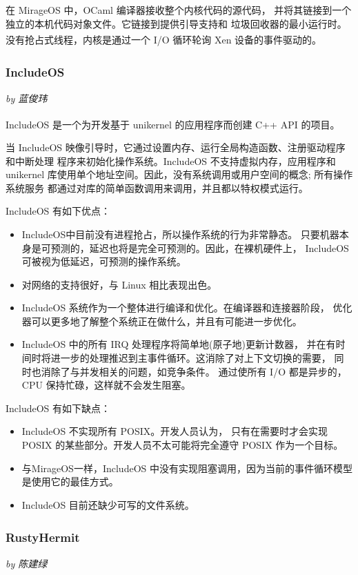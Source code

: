 \documentclass[UTF8,fontset=none,linespread=1.15]{ctexart}
\let\nosupcite\cite
\renewcommand*{\cite}[1]{\textsuperscript{\nosupcite{#1}}}
\newcommand{\sectionauthor}[1]{%
\vspace*{-5ex}
\noindent\textrm{\hfill\textit{by #1}}
\vspace*{2ex}\par}
\begin{document}
在 MirageOS 中，OCaml 编译器接收整个内核代码的源代码，
并将其链接到一个独立的本机代码对象文件。它链接到提供引导支持和
垃圾回收器的最小运行时。没有抢占式线程，内核是通过一个 I/O 循环轮询
Xen 设备的事件驱动的。\cite{bib:11-unikerel2}

\subsubsection[IncludeOS]{IncludeOS\cite{bib:10-includeos2}}\sectionauthor{蓝俊玮}

IncludeOS 是一个为开发基于 unikernel 的应用程序而创建 C++ API 的项目。\cite{bib:9-includeos}

当 IncludeOS 映像引导时，它通过设置内存、运行全局构造函数、注册驱动程序和中断处理
程序来初始化操作系统。IncludeOS 不支持虚拟内存，应用程序和
 unikernel 库使用单个地址空间。因此，没有系统调用或用户空间的概念; 所有操作系统服务
 都通过对库的简单函数调用来调用，并且都以特权模式运行。

\noindent IncludeOS 有如下优点：
\begin{itemize}
\item IncludeOS中目前没有进程抢占，所以操作系统的行为非常静态。
只要机器本身是可预测的，延迟也将是完全可预测的。因此，在裸机硬件上，
IncludeOS可被视为低延迟，可预测的操作系统。
\item 对网络的支持很好，与 Linux 相比表现出色。
\item IncludeOS 系统作为一个整体进行编译和优化。在编译器和连接器阶段，
优化器可以更多地了解整个系统正在做什么，并且有可能进一步优化。
\item IncludeOS 中的所有 IRQ 处理程序将简单地(原子地)更新计数器，
并在有时间时将进一步的处理推迟到主事件循环。这消除了对上下文切换的需要，
同时也消除了与并发相关的问题，如竞争条件。
通过使所有 I/O 都是异步的，CPU 保持忙碌，这样就不会发生阻塞。
\end{itemize}

\noindent IncludeOS 有如下缺点：
\begin{itemize}
\item IncludeOS 不实现所有 POSIX。开发人员认为，
只有在需要时才会实现 POSIX 的某些部分。开发人员不太可能将完全遵守 POSIX 作为一个目标。
\item 与MirageOS一样，IncludeOS 中没有实现阻塞调用，因为当前的事件循环模型是使用它的最佳方式。
\item IncludeOS 目前还缺少可写的文件系统。
\end{itemize}

\subsubsection[RustyHermit]{RustyHermit\cite{bib:14-rusty-hermit}\cite{bib:15-rust-runtime}\cite{bib:16-rust-runtime2}\cite{bib:17-rusty-hermit2}}\sectionauthor{陈建绿}
\end{document}
